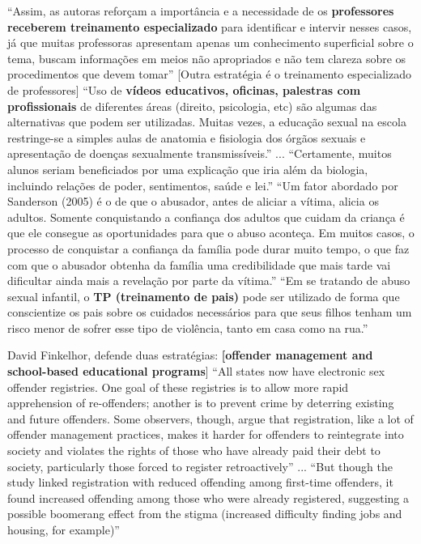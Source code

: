   
``Assim, as autoras reforçam a importância e a necessidade de os \textbf{professores receberem treinamento especializado} para identificar e intervir nesses casos, já que muitas professoras apresentam apenas um conhecimento superficial sobre o tema, buscam informações em meios não apropriados e não tem clareza sobre os procedimentos que devem tomar'' [Outra estratégia é o treinamento especializado de professores] ``Uso de \textbf{vídeos educativos, oficinas, palestras com profissionais} de diferentes áreas (direito, psicologia, etc) são algumas das alternativas que podem ser utilizadas. Muitas vezes, a educação sexual na escola restringe-se a simples aulas de anatomia e fisiologia dos órgãos sexuais e apresentação de doenças sexualmente transmissíveis.'' ... ``Certamente, muitos alunos seriam beneficiados por uma explicação que iria além da biologia, incluindo relações de poder, sentimentos, saúde e lei.'' ``Um fator abordado por Sanderson (2005) é o de que o abusador, antes de aliciar a vítima, alicia os adultos. Somente conquistando a confiança dos adultos que cuidam da criança é que ele consegue as oportunidades para que o abuso aconteça. Em muitos casos, o processo de conquistar a confiança da família pode durar muito tempo, o que faz com que o abusador obtenha da família uma credibilidade que mais tarde vai dificultar ainda mais a revelação por parte da vítima.'' ``Em se tratando de abuso sexual infantil, o \textbf{TP (treinamento de pais)} pode ser utilizado de forma que conscientize os pais sobre os cuidados necessários para que seus filhos tenham um risco menor de sofrer esse tipo de violência, tanto em casa como na rua.'' \cite{pelisoli2010prevenccao}

David Finkelhor, defende duas estratégias: \textbf{[offender management and school-based educational programs}] ``All states now have electronic sex offender registries. One goal of these registries is to allow more rapid apprehension of re-offenders; another is to prevent crime by deterring existing and future offenders. Some observers, though, argue that registration, like a lot of offender management practices, makes it harder for offenders to reintegrate into society and violates the rights of those who have already paid their debt to society, particularly those forced to register retroactively'' ... ``But though the study linked registration with reduced offending among first-time offenders, it found increased offending among those who were already registered, suggesting a possible boomerang effect from the stigma (increased difficulty finding jobs and housing, for example)'' \cite{finkelhor2009prevention}

